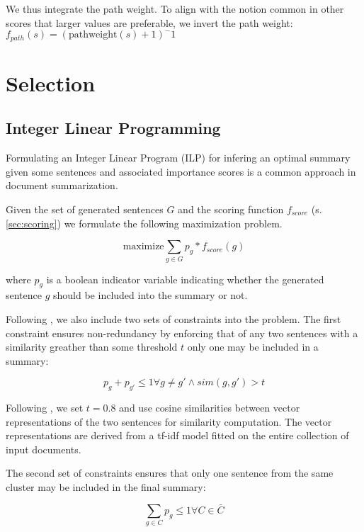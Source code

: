 \documentclass[a4paper,BCOR=10mm]{report}
\begin{document}
We thus integrate the path weight. To align with the notion common in other scores that larger values are preferable, we invert the path weight: $f_{path}(s) = (\text{pathweight}(s) + 1)^-1$

\section{Selection}

\subsection{Integer Linear Programming}

Formulating an Integer Linear Program (ILP) for infering an optimal summary given some sentences and associated importance scores is a common approach in document summarization. %

Given the set of generated sentences $G$ and the scoring function $f_{score}$ (s. \ref{sec:scoring}) we formulate the following maximization problem.

\begin{displaymath}
\text{maximize} \sum_{g \in G} p_g * f_{score}(g)
\end{displaymath}

where $p_g$ is a boolean indicator variable indicating whether the generated sentence $g$ should be included into the summary or not.

Following \citet{banerjee}, we also include two sets of constraints into the problem.
The first constraint ensures non-redundancy by enforcing that of any two sentences with a similarity greather than some threshold $t$ only one may be included in a summary:

\begin{displaymath}
p_g + p_{g'} \leq 1 \forall g \neq g' \land sim(g, g') > t
\end{displaymath}

Following \citet{banerjee}, we set $t = 0.8$ and use cosine similarities between vector representations of the two sentences for similarity computation.
The vector representations are derived from a tf-idf model fitted on the entire collection of input documents.

The second set of constraints ensures that only one sentence from the same cluster may be included in the final summary:

\begin{displaymath}
\sum_{g \in C} p_g \leq 1 \forall C \in \bar{C}
\end{displaymath}
\end{document}
